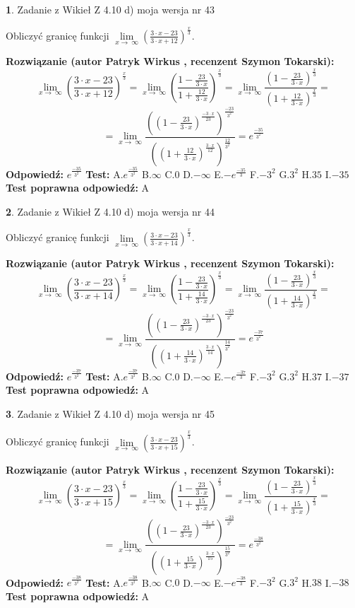 \documentclass[12pt, a4paper]{article}
\theoremstyle{definition} %
\newtheorem{zad}{}
\newcommand{\zadStart}[1]{\begin{zad}#1\newline}
\newcommand{\zadStop}{\end{zad}}
\newcommand{\rozwStart}[2]{\noindent \textbf{Rozwiązanie (autor #1 , recenzent #2): }\newline}
\newcommand{\rozwStop}{\newline}
\newcommand{\odpStart}{\noindent \textbf{Odpowiedź:}\newline}
\newcommand{\odpStop}{\newline}
\newcommand{\testStart}{\noindent \textbf{Test:}\newline}
\newcommand{\testStop}{\newline}
\newcommand{\kluczStart}{\noindent \textbf{Test poprawna odpowiedź:}\newline}
\newcommand{\kluczStop}{\newline}
\begin{document}
\zadStart{Zadanie z Wikieł Z 4.10 d) moja wersja nr 43}


Obliczyć granicę funkcji  $\lim\limits_{x\to\ \infty}(\frac{3\cdot x-23}{3\cdot x+12})^{\frac{x}{3}}$.
\zadStop
\rozwStart{Patryk Wirkus}{Szymon Tokarski}
$$\lim\limits_{x\to\ \infty}(\frac{3\cdot x-23}{3\cdot x+12})^{\frac{x}{3}} = \lim\limits_{x\to\ \infty}(\frac{1-\frac{23}{3\cdot x}}{1+\frac{12}{3\cdot x}})^{\frac{x}{3}}=\lim\limits_{x\to\ \infty}\frac{(1-\frac{23}{3\cdot x})^{\frac{x}{3}}}{(1+\frac{12}{3\cdot x})^{\frac{x}{3}}}=$$
$$=\lim\limits_{x\to\ \infty}\frac{((1-\frac{23}{3\cdot x})^{\frac{-3\cdot x}{23}})^{\frac{-23}{3^{2}}}}{((1+\frac{12}{3\cdot x})^{\frac{3\cdot x}{12}})^{\frac{12}{3^{2}}}}=e^{\frac{-35}{3^{2}}}$$
\rozwStop
\odpStart
$e^{\frac{-35}{3^{2}}}$
\odpStop
\testStart
A.$e^{\frac{-35}{3^{2}}}$ B.$\infty$ C.$0$ D.$-\infty$ E.$-e^{\frac{-35}{3}}$
F.$-3^{2}$ G.$3^{2}$
H.$35$
I.$-35$
\testStop
\kluczStart
A
\kluczStop



\zadStart{Zadanie z Wikieł Z 4.10 d) moja wersja nr 44}


Obliczyć granicę funkcji  $\lim\limits_{x\to\ \infty}(\frac{3\cdot x-23}{3\cdot x+14})^{\frac{x}{3}}$.
\zadStop
\rozwStart{Patryk Wirkus}{Szymon Tokarski}
$$\lim\limits_{x\to\ \infty}(\frac{3\cdot x-23}{3\cdot x+14})^{\frac{x}{3}} = \lim\limits_{x\to\ \infty}(\frac{1-\frac{23}{3\cdot x}}{1+\frac{14}{3\cdot x}})^{\frac{x}{3}}=\lim\limits_{x\to\ \infty}\frac{(1-\frac{23}{3\cdot x})^{\frac{x}{3}}}{(1+\frac{14}{3\cdot x})^{\frac{x}{3}}}=$$
$$=\lim\limits_{x\to\ \infty}\frac{((1-\frac{23}{3\cdot x})^{\frac{-3\cdot x}{23}})^{\frac{-23}{3^{2}}}}{((1+\frac{14}{3\cdot x})^{\frac{3\cdot x}{14}})^{\frac{14}{3^{2}}}}=e^{\frac{-37}{3^{2}}}$$
\rozwStop
\odpStart
$e^{\frac{-37}{3^{2}}}$
\odpStop
\testStart
A.$e^{\frac{-37}{3^{2}}}$ B.$\infty$ C.$0$ D.$-\infty$ E.$-e^{\frac{-37}{3}}$
F.$-3^{2}$ G.$3^{2}$
H.$37$
I.$-37$
\testStop
\kluczStart
A
\kluczStop



\zadStart{Zadanie z Wikieł Z 4.10 d) moja wersja nr 45}


Obliczyć granicę funkcji  $\lim\limits_{x\to\ \infty}(\frac{3\cdot x-23}{3\cdot x+15})^{\frac{x}{3}}$.
\zadStop
\rozwStart{Patryk Wirkus}{Szymon Tokarski}
$$\lim\limits_{x\to\ \infty}(\frac{3\cdot x-23}{3\cdot x+15})^{\frac{x}{3}} = \lim\limits_{x\to\ \infty}(\frac{1-\frac{23}{3\cdot x}}{1+\frac{15}{3\cdot x}})^{\frac{x}{3}}=\lim\limits_{x\to\ \infty}\frac{(1-\frac{23}{3\cdot x})^{\frac{x}{3}}}{(1+\frac{15}{3\cdot x})^{\frac{x}{3}}}=$$
$$=\lim\limits_{x\to\ \infty}\frac{((1-\frac{23}{3\cdot x})^{\frac{-3\cdot x}{23}})^{\frac{-23}{3^{2}}}}{((1+\frac{15}{3\cdot x})^{\frac{3\cdot x}{15}})^{\frac{15}{3^{2}}}}=e^{\frac{-38}{3^{2}}}$$
\rozwStop
\odpStart
$e^{\frac{-38}{3^{2}}}$
\odpStop
\testStart
A.$e^{\frac{-38}{3^{2}}}$ B.$\infty$ C.$0$ D.$-\infty$ E.$-e^{\frac{-38}{3}}$
F.$-3^{2}$ G.$3^{2}$
H.$38$
I.$-38$
\testStop
\kluczStart
A
\kluczStop
\end{document}
